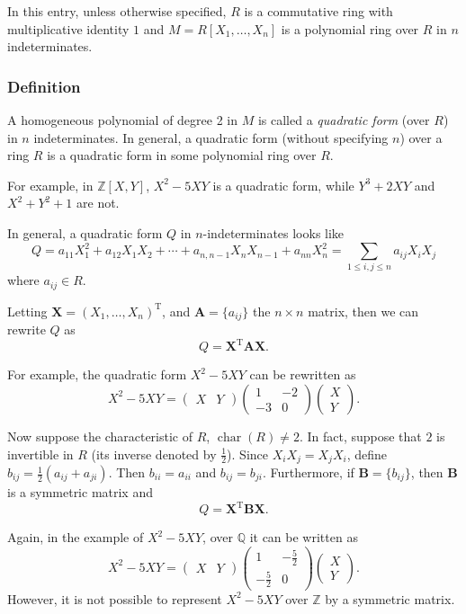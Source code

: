 \documentclass{article}
\newcommand{\bX}{\mathbf{X}}
\newcommand{\bA}{\mathbf{A}}
\newcommand{\bB}{\mathbf{B}}
\newcommand{\0}{\mathbf{0}}
\begin{document}
In this entry, unless otherwise specified, $R$ is a commutative ring with multiplicative identity $1$ and $M=R[X_1,\ldots,X_n]$ is a polynomial ring over $R$ in $n$ indeterminates.

\subsubsection*{Definition}

A homogeneous polynomial of degree 2 in $M$ is called a \emph{quadratic form} (over $R$) in $n$ indeterminates.  In general, a quadratic form (without specifying $n$) over a ring $R$ is a quadratic form in some polynomial ring over $R$.  

For example, in $\mathbb{Z}[X,Y]$, $X^2-5XY$ is a quadratic form, while $Y^3+2XY$ and $X^2+Y^2+1$ are not.

In general, a quadratic form $Q$ in $n$-indeterminates looks like 
$$Q=a_{11}X_1^2+a_{12}X_1X_2+\cdots+a_{n,n-1}X_nX_{n-1}+a_{nn}X_n^2=\sum_{1\le i,j \le n}a_{ij}X_iX_j$$ where $a_{ij}\in R$.

Letting $\bX=(X_1,\ldots,X_n)^{\mathrm{T}}$, and $\bA=\lbrace a_{ij} \rbrace$ the $n\times n$ matrix, then we can rewrite $Q$ as
$$Q={\bX}^{\mathrm{T}} \bA \bX.$$

For example, the quadratic form $X^2-5XY$ can be rewritten as 
$$X^2-5XY=\begin{pmatrix} X & Y \end{pmatrix}\begin{pmatrix} 1 & -2 \\ -3 & 0 \end{pmatrix}\begin{pmatrix} X  \\ Y \end{pmatrix}.$$

Now suppose the characteristic of $R$, $\operatorname{char}(R)\ne 2$.  In fact, suppose that $2$ is invertible in $R$ (its inverse denoted by $\frac{1}{2}$).  Since $X_iX_j=X_jX_i$, define $b_{ij}=\frac{1}{2}(a_{ij}+a_{ji})$.  Then $b_{ii}=a_{ii}$ and $b_{ij}=b_{ji}$.  Furthermore, if $\bB=\lbrace b_{ij}\rbrace$, then $\bB$ is a symmetric matrix and 
$$Q={\bX}^{\mathrm{T}} \bB \bX.$$

Again, in the example of $X^2-5XY$, over $\mathbb{Q}$ it can be written as 
$$X^2-5XY=\begin{pmatrix} X & Y \end{pmatrix}\begin{pmatrix} 1 & -\frac{5}{2} \\ -\frac{5}{2} & 0 \end{pmatrix}\begin{pmatrix} X  \\ Y \end{pmatrix}.$$
However, it is not possible to represent $X^2-5XY$ over $\mathbb{Z}$ by a symmetric matrix.
\end{document}
